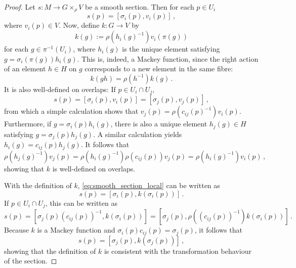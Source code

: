 \documentclass[12pt,a4paper]{article}
\numberwithin{equation}{section}
\theoremstyle{plain}
\theoremstyle{definition}
\theoremstyle{remark}
\begin{document}
\begin{proof}
    Let $s:M\to G\times_\rho V$ be a smooth section. Then for each $p\in U_i$
    \begin{equation}\label{eq:smooth_section_local}
        s(p)=[\sigma_i(p),v_i(p)]\,,
    \end{equation}
    where $v_i(p)\in V$. Now, define $k:G\to V$ by
    \begin{equation}
        k(g):=\rho(h_i(g)^{-1})v_i(\pi(g))
    \end{equation}
    for each $g\in\pi^{-1}(U_i)$, where $h_i(g)$ is the unique element satisfying $g=\sigma_i(\pi(g))h_i(g)$. This is, indeed, a Mackey function, since the right action of an element $h\in H$ on $g$ corresponds to a new element in the same fibre:
    \begin{equation*}
        k(gh)=\rho(h^{-1})k(g)\,.
    \end{equation*}
    It is also well-defined on overlaps: If $p\in U_i\cap U_j$,
    \begin{equation}
        s(p)=[\sigma_i(p),v_i(p)]=[\sigma_j(p),v_j(p)]\,,
    \end{equation}
    from which a simple calculation shows that $v_j(p)=\rho(c_{ij}(p)^{-1})v_i(p)$. Furthermore, if $g=\sigma_i(p)h_i(g)$, there is also a unique element $h_j(g)\in H$ satisfying $g=\sigma_j(p)h_j(g)$. A similar calculation yields $h_i(g)=c_{ij}(p)h_j(g)$. It follows that
    \begin{equation}
        \rho(h_j(g)^{-1})v_j(p)=
        \rho(h_i(g)^{-1})\rho(c_{ij}(p))v_j(p)=\rho(h_i(g)^{-1})v_i(p)\,,
    \end{equation}
    showing that $k$ is well-defined on overlaps.

    With the definition of $k$, \eqref{eq:smooth_section_local} can be written as
    \begin{equation}
        s(p)=[\sigma_i(p),k(\sigma_i(p))]\,.
    \end{equation}
    If $p\in U_i\cap U_j$, this can be written as
    \begin{equation}
        s(p)=[\sigma_j(p)(c_{ij}(p))^{-1},k(\sigma_i(p))]=[\sigma_j(p),\rho((c_{ij}(p))^{-1})k(\sigma_i(p))]\,.
    \end{equation}
    Because $k$ is a Mackey function and $\sigma_i(p)c_{ij}(p)=\sigma_j(p)$, it follows that
    \begin{equation}
        s(p)=[\sigma_j(p),k(\sigma_j(p))]\,,
    \end{equation}
    showing that the definition of $k$ is consistent with the transformation behaviour of the section.


\end{proof}
\end{document}
